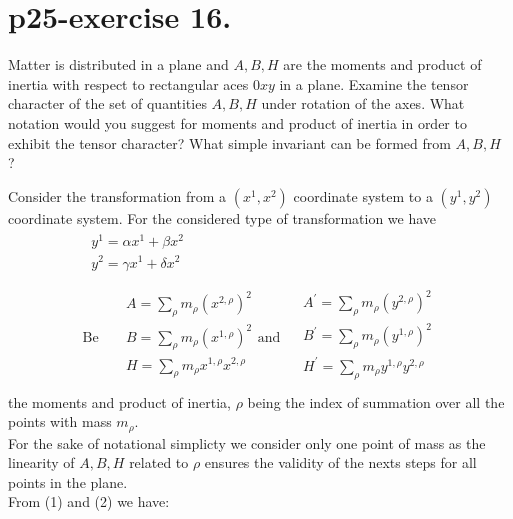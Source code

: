 \section{p25-exercise 16.}
\begin{tcolorbox}
Matter is distributed in a plane and $A,B,H$ are the moments and product of inertia with respect to rectangular aces $0xy$ in a plane. Examine the tensor character of the set of quantities $A,B,H$ under rotation of the axes. What notation would you suggest for moments and product of inertia in order to exhibit the tensor character? What simple invariant can be formed from $A,B,H$ ?
\end{tcolorbox}
Consider the transformation from a $(x^1,x^2)$ coordinate system to a $(y^1,y^2)$ coordinate system. For the considered type of transformation we have
\begin {align}
\begin{array}{c}
\ y^1 = \alpha x^1 + \beta x^2\\
\ y^2 = \gamma x^1 + \delta x^2\\
  \end{array}\\
  \text{Be }\quad  \begin{array}{c}
  \ A = \sum_{\rho} m_{\rho} (x^{2,\rho})^2\\
  \ B = \sum_{\rho} m_{\rho} (x^{1,\rho})^2\\
  \ H = \sum_{\rho} m_{\rho} x^{1,\rho} x^{2,\rho}\\
  \end{array}
    \text{and}\quad  \begin{array}{c}
  \ A^{'} = \sum_{\rho} m_{\rho} (y^{2,\rho})^2\\
  \ B^{'} = \sum_{\rho} m_{\rho} (y^{1,\rho})^2\\
  \ H^{'} = \sum_{\rho} m_{\rho} y^{1,\rho} y^{2,\rho}\\
  \end{array}
\end{align}
the moments and product of inertia, $\rho$ being the index of summation over all the points with mass $m_{\rho}$.\\
For the sake of notational simplicty we consider only one point of mass as the linearity of $A, B, H$ related to $\rho$ ensures the validity of the nexts steps for all points in the plane.\\
From (1) and (2) we have:
